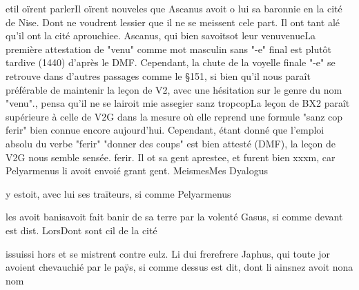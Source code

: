 \documentclass{article}
\begin{document}
\begin{pages}
                        etil oïrent parlerIl oïrent nouveles que Ascanus avoit o lui sa baronnie en la cité de Nise. Dont ne voudrent lessier que il ne se meissent cele
               part. Il ont tant alé qu’il ont la cité aprouchiee.
                  Ascanus, qui bien 
                  savoitsot leur 
                  venuvenueLa première attestation de "venu" comme mot masculin
                  sans "-e" final est plutôt tardive (1440) d'après le DMF. Cependant, la chute de
                  la voyelle finale "-e" se retrouve dans d'autres passages comme le §151, si bien
                  qu'il nous paraît préférable de maintenir la leçon de V2, avec une hésitation sur
                  le genre du nom "venu"., pensa qu’il ne
                  se lairoit mie assegier sanz 
                     tropcopLa leçon de BX2 paraît supérieure à celle de V2G
                     dans la mesure où elle reprend une formule "sanz cop ferir" bien connue encore
                     aujourd'hui. Cependant, étant donné que l'emploi absolu du verbe "ferir"
                     "donner des coups" est bien attesté (DMF), la leçon de V2G nous semble
                     sensée. ferir. Il ot sa gent aprestee, et furent bien xxxm, car Pelyarmenus li avoit envoié grant gent. 
                  MeismesMes
               Dyalogus
               
                  y estoit, 
                  avec lui ses traïteurs, si comme Pelyarmenus
               
                  les avoit banisavoit fait banir de sa terre par la volenté Gasus, si comme devant est dist. 
                  LorsDont sont cil de la cité
               
                  issuissi hors et se mistrent contre eulz. Li dui 
                  frerefrere Japhus, qui toute jor avoient chevauchié par le paÿs, 
                  si comme dessus est dit, dont li ainsnez avoit 
                   nona nom
               

\end{pages}
\end{document}
